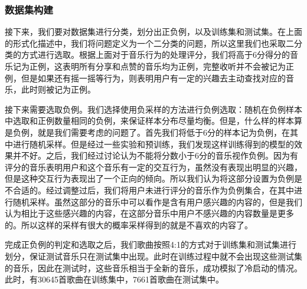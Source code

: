 \subsubsection{数据集构建}
接下来，我们要对数据集进行分类，划分出正负例，以及训练集和测试集。在上面的形式化描述中，我们将问题定义为一个二分类的问题，所以这里我们也采取二分类的方式进行选取。根据上面对于音乐行为的处理评分，我们将高于6分得分的音乐记为正例，这表明所有分享和点赞的音乐均为正例，完整收听并不会被记为正例，但是如果还有摇一摇等行为，则表明用户有一定的兴趣去主动查找对应的音乐，此时则被记为正例。

接下来需要选取负例。我们选择使用负采样的方法进行负例选取：随机在负例样本中选取和正例数量相同的负例，来保证样本分布尽量均衡。但是，什么样的样本算是负例，就是我们需要考虑的问题了。首先我们将低于6分的样本记为负例，在其中进行随机采样。但是经过一些实验和预训练，我们发现这样训练得到的模型的效果并不好。之后，我们经过讨论认为不能将分数小于6分的音乐视作负例。因为有评分的音乐表明用户和这个音乐有一定的交互行为，虽然没有表现出明显的兴趣，但是这种交互行为表现出了一个正向的倾向。所以我们认为将这部分设置为负例是不合适的。经过调整过后，我们将用户未进行评分的音乐作为负例集合，在其中进行随机采样。虽然这部分的音乐中可以看作是含有用户感兴趣的内容的，但是我们认为相比于这些感兴趣的内容，在这部分音乐中用户不感兴趣的内容数量是更多的。所以这样的采样有很大的概率采样得到的就是不喜欢的内容了。

完成正负例的判定和选取之后，我们歌曲按照4:1的方式对于训练集和测试集进行划分，保证测试音乐只在测试集中出现。此时在训练过程中就不会出现这些测试集的音乐，因此在测试时，这些音乐相当于全新的音乐，成功模拟了冷启动的情况。此时，有30645首歌曲在训练集中，7661首歌曲在测试集中。